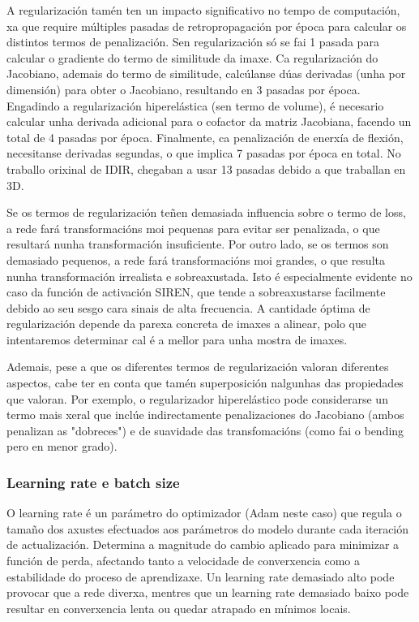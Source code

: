 A regularización tamén ten un impacto significativo no tempo de computación, xa que require múltiples pasadas de retropropagación por época para calcular os distintos termos de penalización.
Sen regularización só se fai 1 pasada para calcular o gradiente do termo de similitude da imaxe.
Ca regularización do Jacobiano, ademais do termo de similitude, calcúlanse dúas derivadas (unha por dimensión) para obter o Jacobiano, resultando en 3 pasadas por época.
Engadindo a regularización hiperelástica (sen termo de volume), é necesario calcular unha derivada adicional para o cofactor da matriz Jacobiana, facendo un total de 4 pasadas por época.
Finalmente, ca penalización de enerxía de flexión, necesitanse derivadas segundas, o que implica 7 pasadas por época en total.
No traballo orixinal de IDIR, chegaban a usar 13 pasadas debido a que traballan en 3D.

Se os termos de regularización teñen demasiada influencia sobre o termo de loss, a rede fará transformacións moi pequenas para evitar ser penalizada, o que resultará nunha transformación insuficiente.
Por outro lado, se os termos son demasiado pequenos, a rede fará transformacións moi grandes, o que resulta nunha transformación irrealista e sobreaxustada. Isto é especialmente evidente no caso da función de activación SIREN, que tende a sobreaxustarse facilmente debido ao seu sesgo cara sinais de alta frecuencia.
A cantidade óptima de regularización depende da parexa concreta de imaxes a alinear, polo que intentaremos determinar cal é a mellor para unha mostra de imaxes.

Ademais, pese a que os diferentes termos de regularización valoran diferentes aspectos, cabe ter en conta que tamén superposición nalgunhas das propiedades que valoran.
Por exemplo, o regularizador hiperelástico pode considerarse un termo mais xeral que inclúe indirectamente penalizaciones do Jacobiano (ambos penalizan as "dobreces") e de suavidade das transfomacións (como fai o bending pero en menor grado).

\subsubsection{Learning rate e batch size}
\label{subsubsec:Learning rate e batch size}

O learning rate é un parámetro do optimizador (Adam neste caso) que regula o tamaño dos axustes efectuados aos parámetros do modelo durante cada iteración de actualización. 
Determina a magnitude do cambio aplicado para minimizar a función de perda, afectando tanto a velocidade de converxencia como a estabilidade do proceso de aprendizaxe.
Un learning rate demasiado alto pode provocar que a rede diverxa, mentres que un learning rate demasiado baixo pode resultar en converxencia lenta ou quedar atrapado en mínimos locais.

